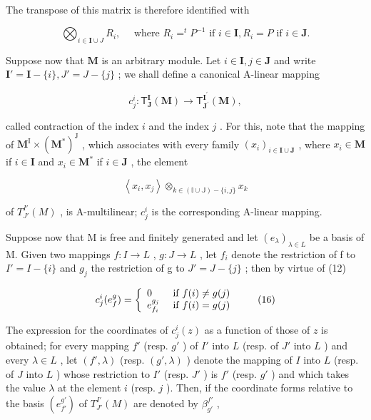 The transpose of this matrix is therefore identified with

\[
\bigotimes_ {i \in \mathbf {I} \cup J} R _ {i}, \quad \text { where } R _ {i} = ^ {t} P ^ {- 1} \text { if } i \in \mathbf {I}, R _ {i} = P \text { if } i \in \mathbf {J}.\tag{14}
\]

Suppose now that \(\mathbf{M}\) is an arbitrary module. Let \(i\in \mathbf{I}, j\in \mathbf{J}\) and write \(\mathbf{I}' = \mathbf{I} - \{i\}, J' = J - \{j\}\) ; we shall define a canonical A-linear mapping

\[
c _ {j} ^ {i} \colon \mathsf {T} _ {\mathbf {J}} ^ {\mathbf {I}} (\mathbf {M}) \to \mathsf {T} _ {\mathbf {J} ^ {\prime}} ^ {\mathbf {I} ^ {\prime}} (\mathbf {M}),
\]

called contraction of the index \(i\) and the index \(j\) . For this, note that the mapping of \(\mathbf{M}^{\mathrm{I}} \times (\mathbf{M}^{*})^{\mathrm{J}}\) , which associates with every family \((x_{i})_{i \in \mathbf{I} \cup \mathbf{J}}\) , where \(x_{i} \in \mathbf{M}\) if \(i \in \mathbf{I}\) and \(x_{i} \in \mathbf{M}^{*}\) if \(i \in \mathbf{J}\) , the element

\[
\left\langle x _ {i}, x _ {j} \right\rangle \otimes_ {k \in (\mathbb {I} \cup \mathbb {J}) - \{i, j \}} x _ {k}\tag{15}
\]

of \(T_{J'}^{I'}(M)\) , is A-multilinear; \(c_{j}^{i}\) is the corresponding A-linear mapping.

Suppose now that M is free and finitely generated and let \((e_{\lambda})_{\lambda \in L}\) be a basis of M. Given two mappings \(f: I \to L\) , \(g: J \to L\) , let \(f_i\) denote the restriction of f to \(I' = I - \{i\}\) and \(g_j\) the restriction of g to \(J' = J - \{j\}\) ; then by virtue of (12)

\[
c _ {j} ^ {i} (e _ {f} ^ {g}) = \left\{ \begin{array}{l l} 0 & \text { if } f (i) \neq g (j) \\ e _ {f _ {i}} ^ {g _ {j}} & \text { if } f (i) = g (j) \end{array} \right.\tag{16}
\]

The expression for the coordinates of \(c_j^i(z)\) as a function of those of \(z\) is obtained; for every mapping \(f'\) (resp. \(g'\) ) of \(I'\) into \(L\) (resp. of \(J'\) into \(L\) ) and every \(\lambda \in L\) , let \((f', \lambda)\) (resp. \((g', \lambda)\) ) denote the mapping of \(I\) into \(L\) (resp. of \(J\) into \(L\) ) whose restriction to \(I'\) (resp. \(J'\) ) is \(f'\) (resp. \(g'\) ) and which takes the value \(\lambda\) at the element \(i\) (resp. \(j\) ). Then, if the coordinate forms relative to the basis \((e_{f'}^{g'})\) of \(T_{J'}^{I'}(M)\) are denoted by \(\beta_{g'}^{f'}\) ,

